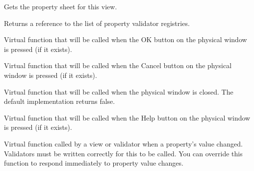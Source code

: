 \label{wxpropertyviewgetpropertysheet}


Gets the property sheet for this view.

\label{wxpropertyviewgetregistrylist}


Returns a reference to the list of property validator registries.

\label{wxpropertyviewonok}


Virtual function that will be called when the OK button on the physical window is pressed (if it exists).

\label{wxpropertyviewoncancel}


Virtual function that will be called when the Cancel button on the physical window is pressed (if it exists).

\label{wxpropertyviewonclose}


Virtual function that will be called when the physical window is closed. The default implementation returns false.

\label{wxpropertyviewonhelp}


Virtual function that will be called when the Help button on the physical window is pressed (if it exists).

\label{wxpropertyviewonpropertychanged}


Virtual function called by a view or validator when a property's value changed. Validators
must be written correctly for this to be called. You can override this function
to respond immediately to property value changes.

\label{wxpropertyviewonupdateview}


